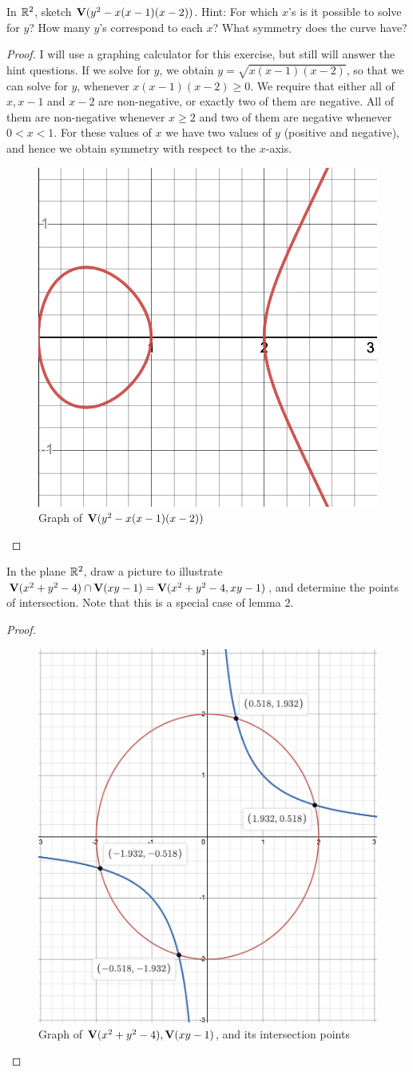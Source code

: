 \begin{exercise}{2}
In $\mathbb{R}^2$, sketch $\mathbf{V}(y^2-x(x-1)(x-2))$. 
Hint: For which $x$'s is it possible to solve for $y$? 
How many $y$'s correspond to each $x$? 
What symmetry does the curve have?
\end{exercise}
\begin{proof}
I will use a graphing calculator for this exercise, but still will answer the hint questions. 
If we solve for $y$, we obtain $y=\sqrt{x(x-1)(x-2)}$, so that we can solve for $y$, whenever $x(x-1)(x-2)\geq 0$. 
We require that either all of $x, x-1$ and $x-2$ are non-negative, or exactly two of them are negative. 
All of them are non-negative whenever $x\geq 2$ and two of them are negative whenever $0<x<1$. 
For these values of $x$ we have two values of $y$ (positive and negative), and hence we obtain symmetry with respect to the $x$-axis.
 \begin{figure}[H]
     \centering
     \includegraphics[width=.5\textwidth]{cox-little-oshea/assets/sec1-2-ex2.png}
     \caption{Graph of $\mathbf{V}(y^2-x(x-1)(x-2))$}
     \label{fig:sec1-2-ex2}
 \end{figure}
\end{proof}

\begin{exercise}{3}
In the plane $\mathbb{R}^2$, draw a picture to illustrate $\mathbf{V}(x^2+y^2-4) \cap \mathbf{V}(xy-1) = \mathbf{V}(x^2+y^2-4,xy-1)$, and determine the points of intersection. Note that this is a special case of lemma 2.
\end{exercise}
\begin{proof}
 \begin{figure}[H]
     \centering
     \includegraphics[width=.5\textwidth]{cox-little-oshea/assets/sec1-2-ex3.png}
     \caption{Graph of $\mathbf{V}(x^2+y^2-4), \mathbf{V}(xy-1)$, and its intersection points}
     \label{fig:sec1-2-ex3}
 \end{figure}
\end{proof}

